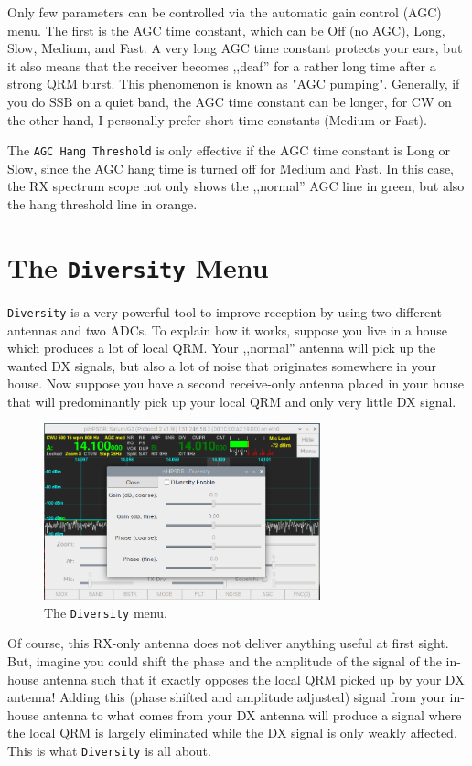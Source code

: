 \documentclass[12pt]{book}
\def\rett#1{\texttt{\color{red}#1}}
\def\bltt#1{\texttt{\color{blue}#1}}
\begin{document}
Only few parameters can be controlled via the automatic gain control (AGC) menu.
The first is the AGC time constant, which can be Off (no AGC), Long, Slow, Medium,
and Fast. A very long AGC time constant protects your ears, but it also means that
the receiver becomes ,,deaf'' for a rather long time after a strong QRM burst. This
phenomenon is known as "AGC pumping". Generally, if you do SSB on a quiet band, the
AGC time constant can be longer, for CW on the other hand, I personally prefer short
time constants (Medium or Fast).

The \rett{AGC Hang Threshold} is only effective if the AGC time constant is Long or Slow,
since the AGC hang time is turned off for Medium and Fast.
In this case, the RX spectrum scope not only shows the ,,normal'' AGC line in green,
but also the hang threshold line in orange.


\section{The \texttt{Diversity} Menu}

\bltt{Diversity} is a very powerful tool to improve reception by using two different
antennas and two ADCs. To explain how it works, suppose you live in a house which produces
a lot of local QRM. Your ,,normal'' antenna will pick up the wanted DX signals, but also
a lot of noise that originates somewhere in your house. Now suppose you have a second
receive-only antenna placed in your house that will predominantly pick up your local
QRM and only very little DX signal.

\begin{figure}[ht]
\center
\includegraphics[width=8cm]{DiversityMenu.png}
\caption{The \bltt{Diversity} menu.}
\label{fig:DiversityMenu}
\end{figure}

Of course, this RX-only antenna does not deliver anything useful at first sight. But, imagine
you could shift the phase and the amplitude of the signal of the in-house antenna such that it
exactly opposes the local QRM picked up by your DX antenna! Adding this (phase shifted and amplitude
adjusted) signal from your in-house antenna to what comes from your DX antenna will produce
a signal where the local QRM is largely eliminated while the DX signal is only weakly affected.
This is what \bltt{Diversity} is all about.
\end{document}
